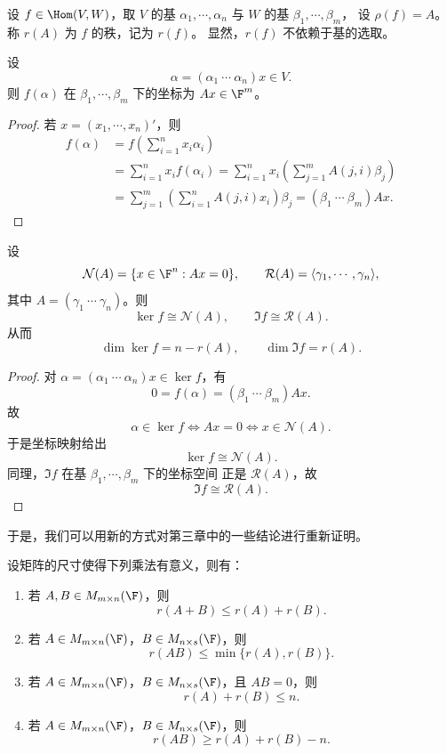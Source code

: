 \begin{definition}\label{p1:concept:c4-l2617}
	设 $f\in\Hom(V,W)$，取 $V$ 的基
	$\alpha_1,\cdots,\alpha_n$ 与 $W$ 的基 $\beta_1,\cdots,\beta_m$，
	设 $\rho(f)=A$。称 $r(A)$ 为 $f$ 的秩，记为 $r(f)$。
	显然，$r(f)$ 不依赖于基的选取。
\end{definition}

\begin{lemma}
	设
	\[
	\alpha=(\alpha_1\ \cdots\ \alpha_n)x\in V.
	\]
	则 $f(\alpha)$ 在 $\beta_1,\cdots,\beta_m$ 下的坐标为 $Ax\in\F^m$。
\end{lemma}

\begin{proof}
	若 $x=(x_1,\cdots,x_n)'$，则
	\[
	\begin{aligned}
		f(\alpha)
		&=f\left(\sum_{i=1}^{n}x_i\alpha_i\right)\\
		&=\sum_{i=1}^{n}x_i f(\alpha_i)=\sum_{i=1}^{n}x_i\left(\sum_{j=1}^{m}A(j,i)\beta_j\right)\\
		&=\sum_{j=1}^{m}\left(\sum_{i=1}^{n}A(j,i)x_i\right)\beta_j=(\beta_1\ \cdots\ \beta_m)Ax.
	\end{aligned}
	\]
\end{proof}

\begin{proposition}
	设
	\[
	\mathcal{N}(A)=\{x\in\F^n:Ax=0\},
	\qquad
	\mathcal{R}(A)=\langle \gamma_1,\cdots,\gamma_n\rangle,
	\]
	其中 $A=(\gamma_1\ \cdots\ \gamma_n)$。则
	\[
	\ker f\cong \mathcal{N}(A),
	\qquad
	\Im f\cong \mathcal{R}(A).
	\]
	从而
	\[
	\dim\ker f=n-r(A),
	\qquad
	\dim\Im f=r(A).
	\]
\end{proposition}

\begin{proof}
	对 $\alpha=(\alpha_1\ \cdots\ \alpha_n)x\in\ker f$，有
	\[
	0=f(\alpha)=(\beta_1\ \cdots\ \beta_m)Ax.
	\]
	故
	\[
	\alpha\in\ker f
	\Longleftrightarrow
	Ax=0
	\Longleftrightarrow
	x\in\mathcal{N}(A).
	\]
	于是坐标映射给出
	\[
	\ker f\cong\mathcal{N}(A).
	\]
	同理，$\Im f$ 在基 $\beta_1,\cdots,\beta_m$ 下的坐标空间
	正是 $\mathcal{R}(A)$，故
	\[
	\Im f\cong\mathcal{R}(A).
	\]
\end{proof}

于是，我们可以用新的方式对第三章中的一些结论进行重新证明。

\begin{example}
	设矩阵的尺寸使得下列乘法有意义，则有：
	\begin{enumerate}
		\item 若 $A,B\in M_{m\times n}(\F)$，则
		\[
		r(A+B)\leq r(A)+r(B).
		\]
		\item 若 $A\in M_{m\times n}(\F)$，$B\in M_{n\times s}(\F)$，则
		\[
		r(AB)\leq \min\{r(A),r(B)\}.
		\]
		\item 若 $A\in M_{m\times n}(\F)$，$B\in M_{n\times s}(\F)$，且 $AB=0$，则
		\[
		r(A)+r(B)\leq n.
		\]
		\item 若 $A\in M_{m\times n}(\F)$，$B\in M_{n\times s}(\F)$，则
		\[
		r(AB)\geq r(A)+r(B)-n.
		\]
	\end{enumerate}
\end{example}

